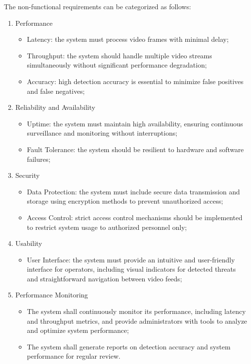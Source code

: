The non-functional requirements can be categorized as follows:
\begin{enumerate}
    \item Performance
    \begin{itemize}
        \item Latency: the system must process video frames with minimal delay;
        \item Throughput: the system should handle multiple video streams simultaneously without significant 
        performance degradation;
        \item Accuracy: high detection accuracy is essential to minimize false positives and false negatives;
    \end{itemize}
    \item Reliability and Availability
    \begin{itemize}
        \item Uptime: the system must maintain high availability, ensuring
        continuous surveillance and monitoring without interruptions;
        \item Fault Tolerance: the system should be resilient to hardware and software failures;
    \end{itemize}
    \item Security
    \begin{itemize}
        \item Data Protection: the system must include
        secure data transmission and storage using encryption methods to prevent unauthorized access;
        \item Access Control: strict access control mechanisms should be implemented to restrict system usage to 
        authorized personnel only;
    \end{itemize}
    \item Usability
    \begin{itemize}
        \item User Interface: the system must provide an intuitive and user-friendly interface for 
        operators, including visual indicators for detected threats and straightforward navigation between 
        video feeds;
    \end{itemize}
    \item Performance Monitoring
        \begin{itemize}
        \item The system shall continuously monitor its performance, including latency and throughput metrics,
        and provide administrators with tools to analyze and optimize system performance;
        \item The system shall generate reports on detection accuracy and system performance for regular review.
        \end{itemize}
  \end{enumerate}

